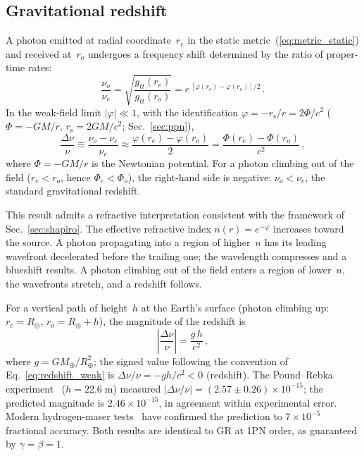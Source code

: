 \documentclass[aps,prd,onecolumn,superscriptaddress,nofootinbib,showpacs,12pt]{revtex4-2}
\newcommand{\rs}{r_{\mathrm{s}}}
\begin{document}
\subsection{Gravitational redshift}\label{sec:redshift}

A photon emitted at radial coordinate~$r_{e}$ in the static
metric~(\ref{eq:metric_static}) and received at~$r_{o}$
undergoes a frequency shift determined by the ratio of
proper-time rates:
\begin{equation}\label{eq:redshift_ratio}
  \frac{\nu_{o}}{\nu_{e}}
  = \sqrt{\frac{g_{tt}(r_{e})}{g_{tt}(r_{o})}}
  = e^{\,[\varphi(r_{e})-\varphi(r_{o})]/2}\,.
\end{equation}
In the weak-field limit $|\varphi| \ll 1$, with the
identification $\varphi = -\rs/r = 2\Phi/c^{2}$
($\Phi=-GM/r$, $\rs=2GM/c^{2}$; Sec.~\ref{sec:ppn}),
\begin{equation}\label{eq:redshift_weak}
  \frac{\Delta\nu}{\nu}
  \equiv \frac{\nu_{o} - \nu_{e}}{\nu_{e}}
  \approx \frac{\varphi(r_{e}) - \varphi(r_{o})}{2}
  = \frac{\Phi(r_{e}) - \Phi(r_{o})}{c^{2}}\,,
\end{equation}
where $\Phi = -GM/r$ is the Newtonian potential.
For a photon climbing out of the field
($r_{e} < r_{o}$, hence $\Phi_{e} < \Phi_{o}$), the
right-hand side is negative: $\nu_{o} < \nu_{e}$,
the standard gravitational redshift.

This result admits a refractive interpretation consistent
with the framework of Sec.~\ref{sec:shapiro}.  The effective
refractive index $n(r) = e^{-\varphi}$ increases toward the
source.  A photon propagating into a region of higher~$n$
has its leading wavefront decelerated before the trailing
one; the wavelength compresses and a blueshift results.
A photon climbing out of the field enters a region of
lower~$n$, the wavefronts stretch, and a redshift follows.

For a vertical path of height~$h$ at the Earth's surface
(photon climbing up: $r_{e}=R_{\oplus}$, $r_{o}=R_{\oplus}+h$),
the magnitude of the redshift is
\begin{equation}\label{eq:pound_rebka}
  \left|\frac{\Delta\nu}{\nu}\right| = \frac{g\,h}{c^{2}}\,,
\end{equation}
where $g = GM_{\oplus}/R_{\oplus}^{2}$; the signed value
following the convention of Eq.~\eqref{eq:redshift_weak}
is $\Delta\nu/\nu = -gh/c^{2} < 0$ (redshift).
The Pound--Rebka experiment~\cite{PoundRebka1960}
($h = 22.6\;\mathrm{m}$) measured
$|\Delta\nu/\nu| = (2.57 \pm 0.26) \times 10^{-15}$;
the predicted magnitude is $2.46 \times 10^{-15}$,
in agreement within experimental error.
Modern hydrogen-maser tests~\cite{VessotLevine1980}
have confirmed the prediction to $7 \times 10^{-5}$
fractional accuracy.  Both results are identical to GR
at 1PN order, as guaranteed by $\gamma = \beta = 1$.
\end{document}
